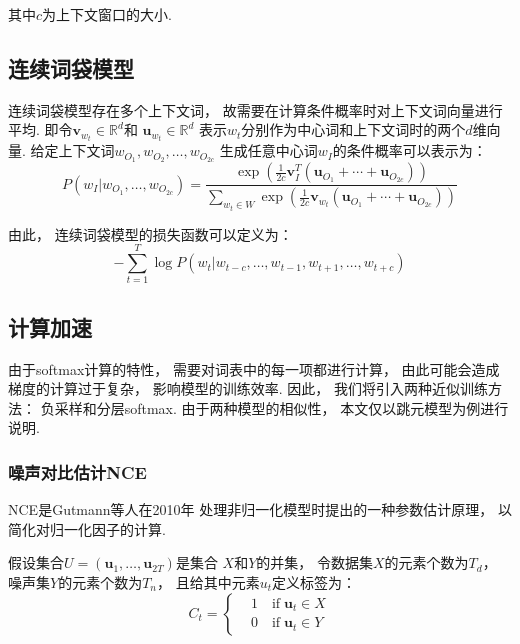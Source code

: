 其中$c$为上下文窗口的大小.

\subsection{连续词袋模型}

连续词袋模型存在多个上下文词，
故需要在计算条件概率时对上下文词向量进行平均.
即令$\mathbf{v}_{w_t}\in\mathbb{R}^d$和
$\mathbf{u}_{w_t}\in\mathbb{R}^d$
表示$w_t$分别作为中心词和上下文词时的两个$d$维向量.
给定上下文词$w_{O_1}, w_{O_2}, \ldots, w_{O_{2c}}$
生成任意中心词$w_I$的条件概率可以表示为：
\begin{equation}
    P\left(w_I|w_{O_1}, \ldots, w_{O_{2c}}\right) = \frac{\exp\left(\frac{1}{2c}\mathbf{v}_I^T\left(\mathbf{u}_{O_1}+\cdots+\mathbf{u}_{O_{2c}}\right)\right)}{\sum_{w_t\in W}\exp\left(\frac{1}{2c}\mathbf{v}_{w_t}\left(\mathbf{u}_{O_1}+\cdots+\mathbf{u}_{O_{2c}}\right)\right)}
\end{equation}

由此，
连续词袋模型的损失函数可以定义为：
\begin{equation}
    -\sum_{t=1}^T\log P\left(w_t|w_{t-c}, \ldots, w_{t-1}, w_{t+1}, \ldots, w_{t+c}\right)
\end{equation}

\subsection{计算加速}

由于softmax计算的特性，
需要对词表中的每一项都进行计算，
由此可能会造成梯度的计算过于复杂，
影响模型的训练效率.
因此，
我们将引入两种近似训练方法：
负采样和分层softmax.
由于两种模型的相似性，
本文仅以跳元模型为例进行说明.

\subsubsection{噪声对比估计NCE}

NCE是Gutmann等人在2010年\cite{gutmannNoisecontrastiveEstimationNew2010}
处理非归一化模型时提出的一种参数估计原理，
以简化对归一化因子的计算.

假设集合$U=\left(\mathbf{u}_1, \ldots, \mathbf{u}_{2T}\right)$是集合
$X$和$Y$的并集，
令数据集$X$的元素个数为$T_d$，
噪声集$Y$的元素个数为$T_n$，
且给其中元素$u_t$定义标签为：
\begin{equation}
    C_t = \left\{
    \begin{aligned}
         & 1 \quad \text{if} \; \mathbf{u}_t \in X \\
         & 0 \quad \text{if} \; \mathbf{u}_t \in Y
    \end{aligned}
    \right.
\end{equation}

